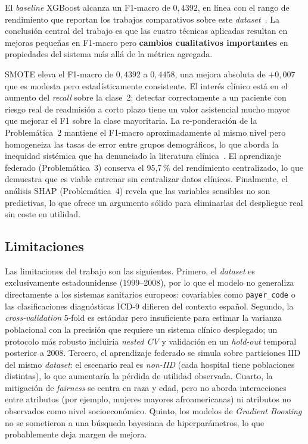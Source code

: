 \documentclass[11pt,a4paper]{article}
\begin{document}
El \textit{baseline} XGBoost alcanza un F1-macro de $0{,}4392$, en línea con el rango de rendimiento que reportan los trabajos comparativos sobre este \textit{dataset}~\cite{ref_sosa, ref_bhardwaj}. La conclusión central del trabajo es que las cuatro técnicas aplicadas resultan en mejoras pequeñas en F1-macro pero \textbf{cambios cualitativos importantes} en propiedades del sistema más allá de la métrica agregada.

SMOTE eleva el F1-macro de $0{,}4392$ a $0{,}4458$, una mejora absoluta de $+0{,}007$ que es modesta pero estadísticamente consistente. El interés clínico está en el aumento del \textit{recall} sobre la clase~2: detectar correctamente a un paciente con riesgo real de readmisión a corto plazo tiene un valor asistencial mucho mayor que mejorar el F1 sobre la clase mayoritaria. La re-ponderación de la Problemática~2 mantiene el F1-macro aproximadamente al mismo nivel pero homogeneiza las tasas de error entre grupos demográficos, lo que aborda la inequidad sistémica que ha denunciado la literatura clínica~\cite{ref_obermeyer}. El aprendizaje federado (Problemática~3) conserva el 95{,}7\,\% del rendimiento centralizado, lo que demuestra que es viable entrenar sin centralizar datos clínicos. Finalmente, el análisis SHAP (Problemática~4) revela que las variables sensibles no son predictivas, lo que ofrece un argumento sólido para eliminarlas del despliegue real sin coste en utilidad.

\subsection{Limitaciones}

Las limitaciones del trabajo son las siguientes. Primero, el \textit{dataset} es exclusivamente estadounidense (1999--2008), por lo que el modelo no generaliza directamente a los sistemas sanitarios europeos: covariables como \texttt{payer\_code} o las clasificaciones diagnósticas ICD-9 difieren del contexto español. Segundo, la \textit{cross-validation} 5-fold es estándar pero insuficiente para estimar la varianza poblacional con la precisión que requiere un sistema clínico desplegado; un protocolo más robusto incluiría \textit{nested CV} y validación en un \textit{hold-out} temporal posterior a 2008. Tercero, el aprendizaje federado se simula sobre particiones IID del mismo \textit{dataset}: el escenario real es \textit{non-IID} (cada hospital tiene poblaciones distintas), lo que aumentaría la pérdida de utilidad observada. Cuarto, la mitigación de \textit{fairness} se centra en raza y edad, pero no aborda interacciones entre atributos (por ejemplo, mujeres mayores afroamericanas) ni atributos no observados como nivel socioeconómico. Quinto, los modelos de \textit{Gradient Boosting} no se sometieron a una búsqueda bayesiana de hiperparámetros, lo que probablemente deja margen de mejora.
\end{document}
